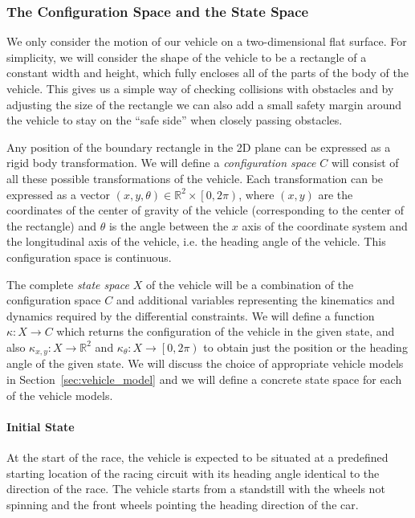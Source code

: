 \subsubsection{The Configuration Space and the State Space}
\label{sec:configuration_and_state_space}

We only consider the motion of our vehicle on a two-dimensional flat surface. For simplicity, we will consider the shape of the vehicle to be a rectangle of a constant width and height, which fully encloses all of the parts of the body of the vehicle. This gives us a simple way of checking collisions with obstacles and by adjusting the size of the rectangle we can also add a small safety margin around the vehicle to stay on the ``safe side'' when closely passing obstacles.

Any position of the boundary rectangle in the 2D plane can be expressed as a rigid body transformation. We will define a \textit{configuration space} $C$ will consist of all these possible transformations of the vehicle. Each transformation can be expressed as a vector $\left( x, y, \theta\right)\in \mathbb{R}^2\times \left[0, 2\pi\right)$, where $\left( x, y\right)$ are the coordinates of the center of gravity of the vehicle (corresponding to the center of the rectangle) and $\theta$ is the angle between the $x$ axis of the coordinate system and the longitudinal axis of the vehicle, i.e. the heading angle of the vehicle.  This configuration space is continuous.

The complete \textit{state space} $X$ of the vehicle will be a combination of the configuration space $C$ and additional variables representing the kinematics and dynamics required by the differential constraints. We will define a function $\kappa: X\rightarrow C$ which returns the configuration of the vehicle in the given state, and also $\kappa_{x,y}: X\rightarrow \mathbb{R}^2$ and $\kappa_\theta: X\rightarrow \left[0, 2\pi\right)$ to obtain just the position or the heading angle of the given state. We will discuss the choice of appropriate vehicle models in Section~\ref{sec:vehicle_model} and we will define a concrete state space for each of the vehicle models.

\paragraph{Initial State}
At the start of the race, the vehicle is expected to be situated at a predefined starting location of the racing circuit with its heading angle identical to the direction of the race. The vehicle starts from a standstill with the wheels not spinning and the front wheels pointing the heading direction of the car.

